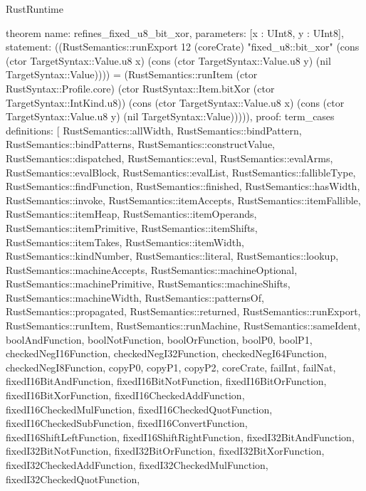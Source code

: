 \begin{lexlean}{RustRuntime}
\begin{semanticmodule}
theorem{
  name: refines_fixed_u8_bit_xor,
  parameters: [x : UInt8, y : UInt8],
  statement: ((RustSemantics::runExport 12 (coreCrate) "fixed_u8::bit_xor" (cons (ctor TargetSyntax::Value.u8 x) (cons (ctor TargetSyntax::Value.u8 y) (nil TargetSyntax::Value)))) = (RustSemantics::runItem (ctor RustSyntax::Profile.core) (ctor RustSyntax::Item.bitXor (ctor TargetSyntax::IntKind.u8)) (cons (ctor TargetSyntax::Value.u8 x) (cons (ctor TargetSyntax::Value.u8 y) (nil TargetSyntax::Value))))),
  proof: term_cases{
    definitions: [
      RustSemantics::allWidth,
      RustSemantics::bindPattern,
      RustSemantics::bindPatterns,
      RustSemantics::constructValue,
      RustSemantics::dispatched,
      RustSemantics::eval,
      RustSemantics::evalArms,
      RustSemantics::evalBlock,
      RustSemantics::evalList,
      RustSemantics::fallibleType,
      RustSemantics::findFunction,
      RustSemantics::finished,
      RustSemantics::hasWidth,
      RustSemantics::invoke,
      RustSemantics::itemAccepts,
      RustSemantics::itemFallible,
      RustSemantics::itemHeap,
      RustSemantics::itemOperands,
      RustSemantics::itemPrimitive,
      RustSemantics::itemShifts,
      RustSemantics::itemTakes,
      RustSemantics::itemWidth,
      RustSemantics::kindNumber,
      RustSemantics::literal,
      RustSemantics::lookup,
      RustSemantics::machineAccepts,
      RustSemantics::machineOptional,
      RustSemantics::machinePrimitive,
      RustSemantics::machineShifts,
      RustSemantics::machineWidth,
      RustSemantics::patternsOf,
      RustSemantics::propagated,
      RustSemantics::returned,
      RustSemantics::runExport,
      RustSemantics::runItem,
      RustSemantics::runMachine,
      RustSemantics::sameIdent,
      boolAndFunction,
      boolNotFunction,
      boolOrFunction,
      boolP0,
      boolP1,
      checkedNegI16Function,
      checkedNegI32Function,
      checkedNegI64Function,
      checkedNegI8Function,
      copyP0,
      copyP1,
      copyP2,
      coreCrate,
      failInt,
      failNat,
      fixedI16BitAndFunction,
      fixedI16BitNotFunction,
      fixedI16BitOrFunction,
      fixedI16BitXorFunction,
      fixedI16CheckedAddFunction,
      fixedI16CheckedMulFunction,
      fixedI16CheckedQuotFunction,
      fixedI16CheckedSubFunction,
      fixedI16ConvertFunction,
      fixedI16ShiftLeftFunction,
      fixedI16ShiftRightFunction,
      fixedI32BitAndFunction,
      fixedI32BitNotFunction,
      fixedI32BitOrFunction,
      fixedI32BitXorFunction,
      fixedI32CheckedAddFunction,
      fixedI32CheckedMulFunction,
      fixedI32CheckedQuotFunction,
}}
\end{semanticmodule}
\end{lexlean}
